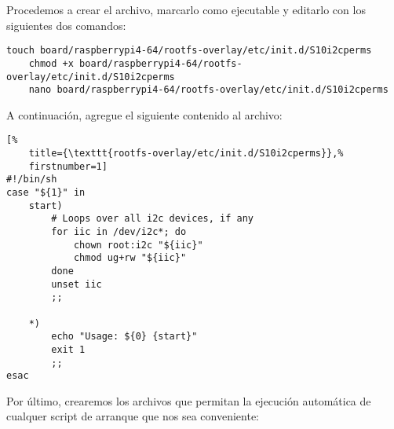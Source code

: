 \begin{samepage}
Procedemos a crear el archivo, marcarlo como ejecutable y editarlo con los siguientes dos comandos:

\begin{Verbatim}[gobble=1]
	touch board/raspberrypi4-64/rootfs-overlay/etc/init.d/S10i2cperms
	chmod +x board/raspberrypi4-64/rootfs-overlay/etc/init.d/S10i2cperms
	nano board/raspberrypi4-64/rootfs-overlay/etc/init.d/S10i2cperms
\end{Verbatim}
\end{samepage}

\begin{samepage}
\noindent
A continuación, agregue el siguiente contenido al archivo:

\noindent
\begin{minipage}{\columnwidth}
\begin{lstlisting}[%
	title={\texttt{rootfs-overlay/etc/init.d/S10i2cperms}},%
	firstnumber=1]
#!/bin/sh
case "${1}" in
    start)
        # Loops over all i2c devices, if any
        for iic in /dev/i2c*; do
            chown root:i2c "${iic}"
            chmod ug+rw "${iic}"
        done
        unset iic
        ;;

    *)
        echo "Usage: ${0} {start}"
        exit 1
        ;;
esac
\end{lstlisting}
\end{minipage}
\end{samepage}

\medskip{}

Por último, crearemos los archivos que permitan la ejecución automática de cualquer script de arranque que nos sea conveniente:

